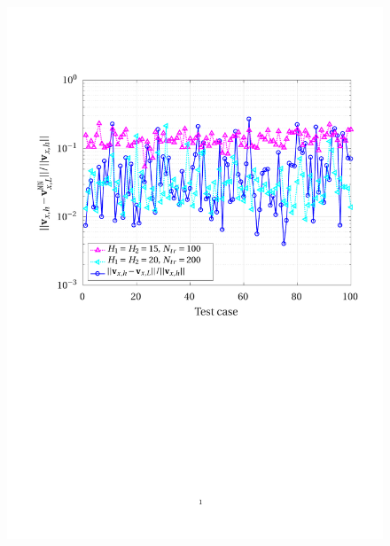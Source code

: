 \documentclass[12pt, a4paper, twoside, openright]{report}
\numberwithin{equation}{chapter}
\theoremstyle{theorem}
\theoremstyle{definition}
\theoremstyle{remark}
\theoremstyle{proposition}
\numberwithin{figure}{chapter}
\begin{document}
	\begin{figure}[H]
		\center
		\includegraphics[scale = 0.75, trim = {1.5cm 12cm 1cm 3.5cm}, clip]{dc_400_vx_pointwise_error_nn}
	\end{figure}
	
\end{document}

